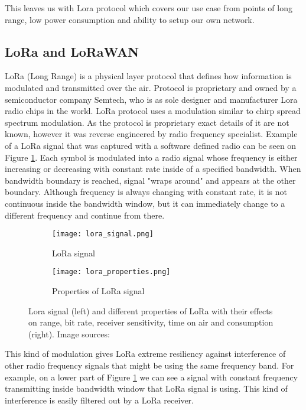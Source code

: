 This leaves us with Lora protocol which covers our use case from points of long range, low power consumption and ability to setup our own network. 


\subsection{ LoRa and LoRaWAN}

LoRa (Long Range) is a physical layer protocol that defines how information is modulated and transmitted over the air\cite{lora_article}\cite{lora_nbiot}.
Protocol is proprietary and owned by a semiconductor company Semtech, who is as sole designer and manufacturer Lora radio chips in the world.
LoRa protocol uses a modulation similar to chirp spread spectrum modulation\cite{lora_article}.
As the protocol is proprietary exact details of it are not known, however it was reverse engineered by radio frequency specialist\cite{lora_github}.
Example of a LoRa signal that was captured with a software defined radio can be seen on Figure \ref{lora1}.
Each symbol is modulated into a radio signal whose frequency is either increasing or decreasing with constant rate inside of a specified bandwidth.
When bandwidth boundary is reached, signal "wraps around" and appears at the other boundary.
Although frequency is always changing with constant rate, it is not continuous inside the bandwidth window, but it can immediately change to a different frequency and continue from there.

\begin{figure}[ht]
    \begin{subfigure}{0.3\textwidth}
        \centering
        \texttt{[image: lora\_signal.png]} 
        \caption{ LoRa signal}
        \label{lora1}
    \end{subfigure}
    \hspace{0.5cm}%
    \begin{subfigure}{0.7\textwidth}
        \texttt{[image: lora\_properties.png]}
        \caption{ Properties of LoRa signal}
        \label{lora2}
    \end{subfigure}
    \caption{Lora signal (left) and different properties of LoRa with their effects on range, bit rate, receiver sensitivity, time on air and consumption (right). Image sources:\cite{lora_github}\cite{lora_philly}}
    \label{lora}
\end{figure}

This kind of modulation gives LoRa extreme resiliency against interference of other radio frequency signals that might be using the same frequency band\cite{lora_article}\cite{lora_philly}.
For example, on a lower part of Figure \ref{lora1} we can see a signal with constant frequency transmitting inside bandwidth window that LoRa signal is using.
This kind of interference is easily filtered out by a LoRa receiver.


